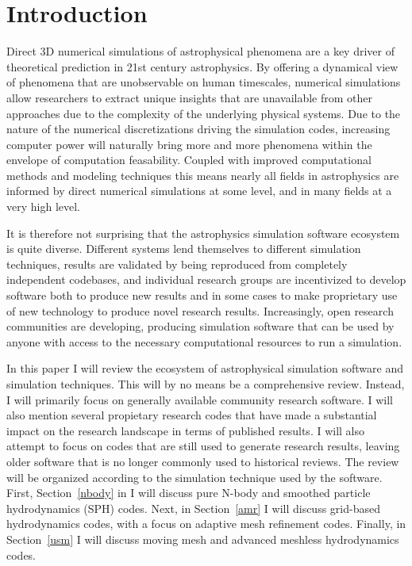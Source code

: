 \documentclass[11pt,twoside]{article}
\begin{document}
\section{Introduction}
Direct 3D numerical simulations of astrophysical phenomena are a key driver of theoretical prediction in 21st century astrophysics. By offering a dynamical view of phenomena that are unobservable on human timescales, numerical simulations allow researchers to extract unique insights that are unavailable from other approaches due to the complexity of the underlying physical systems. Due to the nature of the numerical discretizations driving the simulation codes, increasing computer power will naturally bring more and more phenomena within the envelope of computation feasability. Coupled with improved computational methods and modeling techniques this means nearly all fields in astrophysics are informed by direct numerical simulations at some level, and in many fields at a very high level.

It is therefore not surprising that the astrophysics simulation software ecosystem is quite diverse. Different systems lend themselves to different simulation techniques, results are validated by being reproduced from completely independent codebases, and individual research groups are incentivized to develop software both to produce new results and in some cases to make proprietary use of new technology to produce novel research results. Increasingly, open research communities are developing, producing simulation software that can be used by anyone with access to the necessary computational resources to run a simulation.

In this paper I will review the ecosystem of astrophysical simulation software and simulation techniques. This will by no means be a comprehensive review. Instead, I will primarily focus on generally available community research software. I will also mention several propietary research codes that have made a substantial impact on the research landscape in terms of published results. I will also attempt to focus on codes that are still used to generate research results, leaving older software that is no longer commonly used to historical reviews. The review will be organized according to the simulation technique used by the software. First, Section~\ref{nbody} in I will discuss pure N-body and smoothed particle hydrodynamics (SPH) codes. Next, in Section~\ref{amr} I will discuss grid-based hydrodynamics codes, with a focus on adaptive mesh refinement codes. Finally, in Section~\ref{usm} I will discuss moving mesh and advanced meshless hydrodynamics codes.
\end{document}
